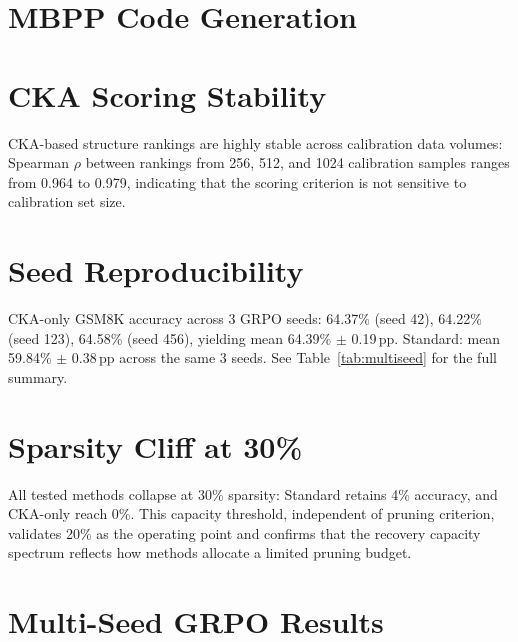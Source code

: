 

\section{MBPP Code Generation}
\label{sec:appendix_mbpp}



\section{CKA Scoring Stability}
\label{sec:appendix_cka_stability}



CKA-based structure rankings are highly stable across calibration data volumes: Spearman $\rho$ between rankings from 256, 512, and 1024 calibration samples ranges from 0.964 to 0.979, indicating that the scoring criterion is not sensitive to calibration set size.

\section{Seed Reproducibility}
\label{sec:appendix_seed}

CKA-only GSM8K accuracy across 3 GRPO seeds: 64.37\% (seed 42), 64.22\% (seed 123), 64.58\% (seed 456), yielding mean 64.39\% $\pm$ 0.19\,pp.
Standard: mean 59.84\% $\pm$ 0.38\,pp across the same 3 seeds.
See Table~\ref{tab:multiseed} for the full summary.

\section{Sparsity Cliff at 30\%}
\label{sec:appendix_sparsity_cliff}



All tested methods collapse at 30\% sparsity: Standard retains 4\% accuracy, \rasp{} and CKA-only reach 0\%.
This capacity threshold, independent of pruning criterion, validates 20\% as the operating point and confirms that the recovery capacity spectrum reflects how methods allocate a limited pruning budget.

\section{Multi-Seed GRPO Results}
\label{sec:appendix_multiseed}


